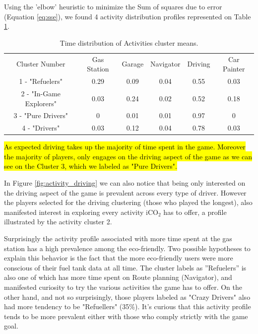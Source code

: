 \documentclass[preprint,authoryear,12pt]{elsarticle}
\newcommand{\hlc}[2][yellow]{ {\sethlcolor{#1} \hl{#2}} }
\begin{document}
{ 
Using the 'elbow' heuristic to minimize the Sum of squares due to error (Equation \ref{eq:sse}), we found 4 activity distribution profiles represented on Table \ref{T:cluster_activities}.  
}
\begin{table}[!h]
	\renewcommand*{\arraystretch}{1.2}
	\caption{Time distribution of Activities cluster means.}
	\begin{center}
		\begin{tabular}{c|c|c|c|c|c}
			Cluster Number	& Gas Station &	Garage &	Navigator &	Driving &	Car Painter 	\\
			1 - "Refuelers" &	0.29 &	0.09 &	0.04 &	0.55 &	0.03\\
			2 - "In-Game Explorers" &	0.03 &	0.24 &	0.02 &	0.52 &	0.18 \\
			3 - "Pure Drivers" &	0 &	0.01 &	0.01 &	0.97 &	0  \\
			4 - "Drivers" &	0.03 &	0.12 &	0.04 &	0.78 &	0.03   \\
		\end{tabular}
	\end{center}
	\label{T:cluster_activities}
\end{table}

\hlc[green]{
As expected driving takes up the majority of time spent in the game. Moreover the majority of players, only engages on the driving aspect of the game as we can see on the Cluster 3, which we labeled as "Pure Drivers". 
}

In Figure \ref{fig:activity_driving} we can also notice that being only interested on the driving aspect of the game is prevalent across every type of driver. However the players selected for the driving clustering (those who played the longest), also manifested interest in exploring every activity iCO$_2$ has to offer, a profile illustrated by the activity cluster 2.

Surprisingly the activity profile associated with more time spent at the gas station has a high prevalence among the eco-friendly. Two possible hypotheses to explain this behavior is the fact that the more eco-friendly users were more conscious of their fuel tank data at all time. The cluster labels as ''Refuelers'' is also one of which has more time spent on Route planning (Navigator), and manifested curiosity to try the various activities the game has to offer. On the other hand, and not so surprisingly, those players labeled as "Crazy Drivers" also had more tendency to be "Refuellers" (35\%). It's curious that this activity profile tends to be more prevalent either with those who comply strictly with the game goal. 
\end{document}
